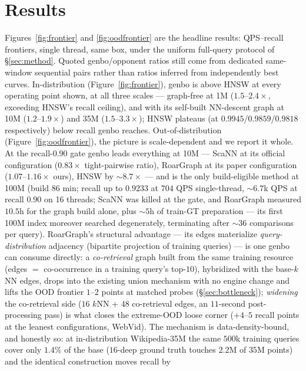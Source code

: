\documentclass{article}
\begin{document}
\section{Results}
\label{sec:eval}
Figures~\ref{fig:frontier} and \ref{fig:oodfrontier} are the headline results:
QPS--recall frontiers, single thread, same box, under the uniform full-query
protocol of \S\ref{sec:method}.
Quoted genbo/opponent ratios still come from dedicated same-window sequential
pairs rather than ratios inferred from independently best curves.
In-distribution (Figure~\ref{fig:frontier}), genbo is
above HNSW at every operating point shown, at all three scales --- graph-free at 1M
($1.5$--$2.4\times$, exceeding HNSW's recall ceiling), and with its self-built
NN-descent graph at 10M ($1.2$--$1.9\times$) and 35M ($1.5$--$3.3\times$); HNSW
plateaus (at $0.9945$/$0.9859$/$0.9818$ respectively) below recall genbo reaches.
Out-of-distribution (Figure~\ref{fig:oodfrontier}), the picture is scale-dependent
and we report it whole. At the recall-$0.90$ gate genbo leads everything at 10M ---
ScaNN at its official configuration ($0.83\times$ tight-pairwise ratio), RoarGraph at
its paper configuration ($1.07$--$1.16\times$ ours), HNSW by ${\sim}8.7\times$ ---
and is the only build-eligible method at 100M (build $86$ min; recall up to $0.9233$
at $704$ QPS single-thread, ${\sim}6.7$k QPS at recall $0.90$ on 16 threads; ScaNN
was killed at the gate, and RoarGraph measured $10.5$h for the graph build alone,
plus ${\sim}5$h of train-GT preparation --- its first 100M index moreover searched
degenerately, terminating after ${\sim}36$ comparisons per query). RoarGraph's structural advantage --- its edges materialize
\emph{query-distribution} adjacency (bipartite projection of training queries) ---
is one genbo can consume directly: a \emph{co-retrieval} graph built from the same
training resource (edges $=$ co-occurrence in a training query's top-$10$), hybridized
with the base-$k$NN edges, drops into the existing union mechanism with no engine
change and lifts the OOD frontier $1$--$2$ points at matched probes
(\S\ref{sec:bottleneck}); \emph{widening} the co-retrieval side ($16$ $k$NN $+$ $48$
co-retrieval edges, an $11$-second post-processing pass) is what closes the extreme-OOD
loose corner ($+4$--$5$ recall points at the leanest configurations, WebVid). The
mechanism is data-density-bound, and honestly so: at in-distribution Wikipedia-35M the
same $500$k training queries cover only $1.4\%$ of the base ($16$-deep ground truth
touches $2.2$M of $35$M points) and the identical construction moves recall by
\end{document}
